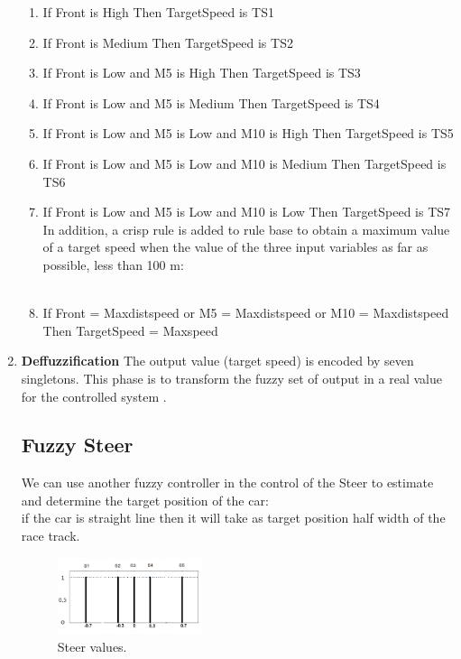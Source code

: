 \documentclass{llncs}
\begin{document}
\begin{enumerate}
\begin{enumerate}
		
		\item If Front is High Then TargetSpeed is TS1
		\item If Front is Medium Then TargetSpeed is TS2
		\item If Front is Low and M5 is High Then TargetSpeed is TS3
		\item If Front is Low and M5 is Medium Then TargetSpeed is TS4
		\item If Front is Low and M5 is Low and M10 is High Then TargetSpeed is TS5
		\item If Front is Low and M5 is Low and M10 is Medium Then TargetSpeed is TS6
		\item  If Front is Low and M5 is Low and M10 is Low Then TargetSpeed is TS7
		\\
		In addition, a crisp rule is added to rule base to obtain a maximum value of a target speed when the value of the three input variables as far as possible, less than 100 m: \\\\
		\item If Front = Maxdistspeed or M5 = Maxdistspeed or M10 = Maxdistspeed Then TargetSpeed = Maxspeed	
		
	\end{enumerate}
	
	\item{\textbf{Deffuzzification}}
	The output value (target speed) is encoded by seven singletons.
	This phase is to transform the fuzzy set of output in a real value for the controlled system . \\
	
	\subsection{Fuzzy Steer}
	
	We can use another fuzzy controller in the control of the Steer to estimate and determine the target position of the car:\\
	if the car is straight line then it will take as target position half width of the race track.\\
	
	
	\begin{figure}[h!]
		
		\centering
		\includegraphics[width=0.4\textwidth]{fig/speed2.png}
		\begin{minipage}{10cm}
			\centering
			\caption{\footnotesize Steer values.}
			\label{fontfig6}
		\end{minipage} 
	\end{figure}
	

\end{enumerate}
\end{document}
